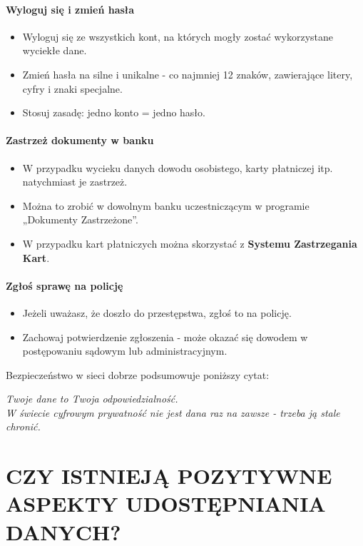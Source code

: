 \subsubsection{Wyloguj się i zmień hasła}
\begin{itemize}
    \item Wyloguj się ze wszystkich kont, na których mogły zostać wykorzystane wyciekłe dane.
    \item Zmień hasła na silne i unikalne - co najmniej 12 znaków, zawierające litery, cyfry i znaki specjalne.
    \item Stosuj zasadę: jedno konto = jedno hasło.
\end{itemize}

\subsubsection{Zastrzeż dokumenty w banku}
\begin{itemize}
    \item W przypadku wycieku danych dowodu osobistego, karty płatniczej itp. natychmiast je zastrzeż.
    \item Można to zrobić w dowolnym banku uczestniczącym w programie „Dokumenty Zastrzeżone”.
    \item W przypadku kart płatniczych można skorzystać z \textbf{Systemu Zastrzegania Kart}.
\end{itemize}

\subsubsection{Zgłoś sprawę na policję}
\begin{itemize}
    \item Jeżeli uważasz, że doszło do przestępstwa, zgłoś to na policję.
    \item Zachowaj potwierdzenie zgłoszenia - może okazać się dowodem w postępowaniu sądowym lub administracyjnym.
\end{itemize}

Bezpieczeństwo w sieci dobrze podsumowuje poniższy cytat:
\begin{center}
\textit{Twoje dane to Twoja odpowiedzialność.\\
W świecie cyfrowym prywatność nie jest dana raz na zawsze - trzeba ją stale chronić.}
\end{center}

\chapter{CZY ISTNIEJĄ POZYTYWNE ASPEKTY UDOSTĘPNIANIA DANYCH?}

